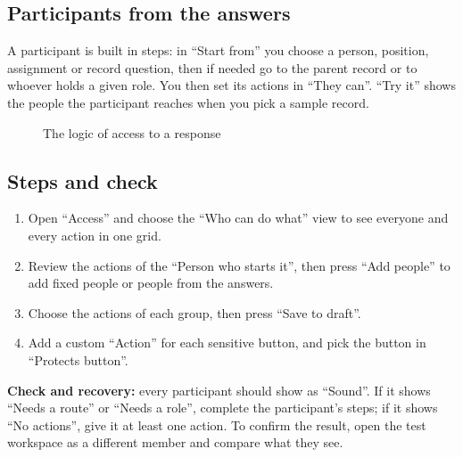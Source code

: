 \subsection{Participants from the answers}
A participant is built in steps: in “Start from” you choose a person, position, assignment or record question, then if needed go to the parent record or to whoever holds a given role. You then set its actions in “They can”. “Try it” shows the people the participant reaches when you pick a sample record.

\begin{figure}[H]
\centering
{}
\rclegend
\caption{The logic of access to a response}
\label{fig:builder-forms-access-flow}
\end{figure}

\subsection{Steps and check}
\begin{enumerate}
\item Open “Access” and choose the “Who can do what” view to see everyone and every action in one grid.
\item Review the actions of the “Person who starts it”, then press “Add people” to add fixed people or people from the answers.
\item Choose the actions of each group, then press “Save to draft”.
\item Add a custom “Action” for each sensitive button, and pick the button in “Protects button”.
\end{enumerate}

\textbf{Check and recovery:} every participant should show as “Sound”. If it shows “Needs a route” or “Needs a role”, complete the participant's steps; if it shows “No actions”, give it at least one action. To confirm the result, open the test workspace as a different member and compare what they see.


